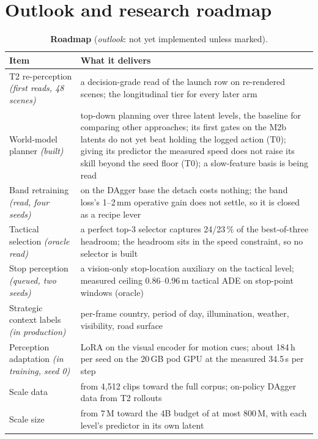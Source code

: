 \documentclass[10pt,twocolumn]{article}
\theoremstyle{remark}
\newcommand{\tier}[1]{\textsc{\small #1}}
\begin{document}
\section{Outlook and research roadmap}\label{sec:outlook}
\begin{table}[t]
\centering
\caption{\textbf{Roadmap} (\emph{outlook}: not yet implemented unless marked).}
\label{tab:roadmap}
\small
\begin{tabularx}{\columnwidth}{@{}>{\raggedright\arraybackslash}p{24mm}>{\raggedright\arraybackslash}X@{}}
\toprule
Item & What it delivers \\
\midrule
T2 re-perception \textit{(first reads, 48 scenes)} & a decision-grade read of the launch row on re-rendered scenes; the longitudinal tier for every later arm \\
World-model planner \textit{(built)} & top-down planning over three latent levels, the baseline for comparing other approaches; its first gates on the M2b latents do not yet beat holding the logged action (\tier{T0}); giving its predictor the measured speed does not raise its skill beyond the seed floor (\tier{T0}); a slow-feature basis is being read \\
Band retraining \textit{(read, four seeds)} & on the DAgger base the detach costs nothing; the band loss's 1--2\,mm operative gain does not settle, so it is closed as a recipe lever \\
Tactical selection \textit{(oracle read)} & a perfect top-3 selector captures 24/23\,\% of the best-of-three headroom; the headroom sits in the speed constraint, so no selector is built \\
Stop perception \textit{(queued, two seeds)} & a vision-only stop-location auxiliary on the tactical level; measured ceiling 0.86--0.96\,m tactical ADE on stop-point windows (oracle) \\
Strategic context labels \textit{(in production)} & per-frame country, period of day, illumination, weather, visibility, road surface \\
Perception adaptation \textit{(in training, seed 0)} & LoRA on the visual encoder for motion cues; about 184\,h per seed on the 20\,GB pod GPU at the measured 34.5\,s per step \\
Scale data & from 4,512 clips toward the full corpus; on-policy DAgger data from T2 rollouts \\
Scale size & from 7\,M toward the 4B budget of at most 800\,M, with each level's predictor in its own latent \\

\end{tabularx}
\end{table}
\end{document}
